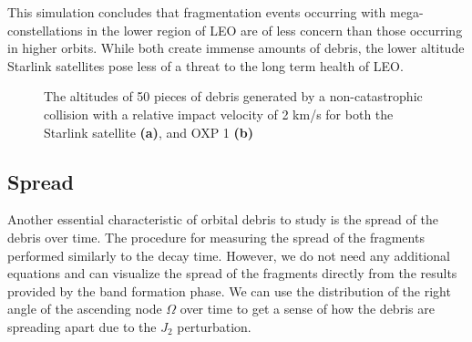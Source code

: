 \documentclass[a4paper, 12pt]{article}
\begin{document}
This simulation concludes that fragmentation events occurring with mega-constellations in the lower region of LEO are of less concern than those occurring in higher orbits. While both create immense amounts of debris, the lower altitude Starlink satellites pose less of a threat to the long term health of LEO.
\begin{figure}[h!]
	\begin{adjustbox}{max width=1\linewidth,center}
		\centering     %
	\end{adjustbox}
	\caption{The altitudes of 50 pieces of debris generated by a non-catastrophic collision with a relative impact velocity of 2 km/s for both the Starlink satellite \textbf{(a)}, and OXP 1 \textbf{(b)} }
	\label{altitudes}
\end{figure}

\newpage
\subsection{Spread}
Another essential characteristic of orbital debris to study is the spread of the debris over time. The procedure for measuring the spread of the fragments performed similarly to the decay time. However, we do not need any additional equations and can visualize the spread of the fragments directly from the results provided by the band formation phase. We can use the distribution of the right angle of the ascending node $\Omega$ over time to get a sense of how the debris are spreading apart due to the $J_2$ perturbation.
\end{document}
